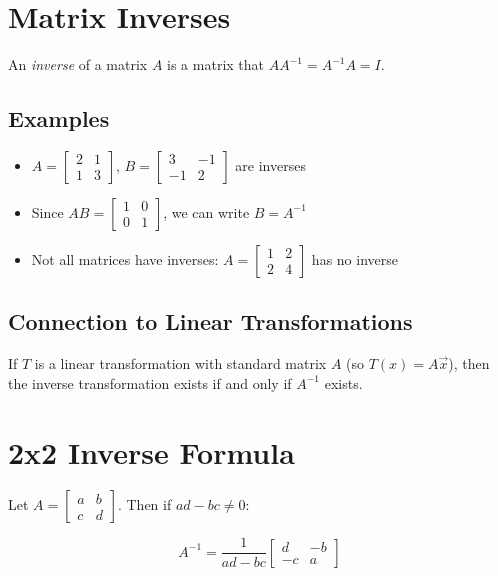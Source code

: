 \documentclass[12pt,a4paper]{article}
\begin{document}
\section{Matrix Inverses}

An \textit{inverse} of a matrix $A$ is a matrix that $AA^{-1} = A^{-1}A = I$.

\subsection{Examples}

\begin{itemize}
    \item $A = \begin{bmatrix} 2 & 1 \\ 1 & 3 \end{bmatrix}$, $B = \begin{bmatrix} 3 & -1 \\ -1 & 2 \end{bmatrix}$ are inverses
    \item Since $AB = \begin{bmatrix} 1 & 0 \\ 0 & 1 \end{bmatrix}$, we can write $B = A^{-1}$
    \item Not all matrices have inverses: $A = \begin{bmatrix} 1 & 2 \\ 2 & 4 \end{bmatrix}$ has no inverse
\end{itemize}

\subsection{Connection to Linear Transformations}

If $T$ is a linear transformation with standard matrix $A$ (so $T(x) = A\vec{x}$), then the inverse transformation exists if and only if $A^{-1}$ exists.

\section{2x2 Inverse Formula}

Let $A = \begin{bmatrix} a & b \\ c & d \end{bmatrix}$. Then if $ad-bc \neq 0$:

\[A^{-1} = \frac{1}{ad-bc} \begin{bmatrix} d & -b \\ -c & a \end{bmatrix}\]
\end{document}
